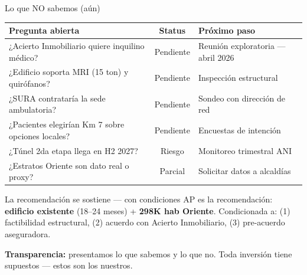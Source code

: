\documentclass[aspectratio=169, 11pt]{beamer}
\begin{document}
{
\begin{frame}{Lo que NO sabemos (aún)}
\vspace{-2pt}
{\tiny
\begin{tabular}{@{}p{5.5cm}cp{5cm}@{}}
\toprule
\textbf{Pregunta abierta} & \textbf{Status} & \textbf{Próximo paso} \\
\midrule
\rowcolor{amber!8}
¿Acierto Inmobiliario quiere inquilino médico? & Pendiente & Reunión exploratoria --- abril 2026 \\
¿Edificio soporta MRI (15 ton) y quirófanos? & Pendiente & Inspección estructural \\
\rowcolor{amber!8}
¿SURA contrataría la sede ambulatoria? & Pendiente & Sondeo con dirección de red \\
¿Pacientes elegirían Km 7 sobre opciones locales? & Pendiente & Encuestas de intención \\
\rowcolor{amber!8}
¿Túnel 2da etapa llega en H2 2027? & Riesgo & Monitoreo trimestral ANI \\
¿Estratos Oriente son dato real o proxy? & Parcial & Solicitar datos a alcaldías \\
\bottomrule
\end{tabular}
}

\vspace{3pt}
\begin{exampleblock}{\small La recomendación se sostiene --- con condiciones}
\scriptsize
AP es la recomendación: \textbf{edificio existente} (18--24 meses) + \textbf{298K hab Oriente}. Condicionada a: (1) factibilidad estructural, (2) acuerdo con Acierto Inmobiliario, (3) pre-acuerdo aseguradora.
\end{exampleblock}

{\tiny\textcolor{amber!80!black}{\textbf{Transparencia:}} presentamos lo que sabemos y lo que no. Toda inversión tiene supuestos --- estos son los nuestros.}
\end{frame}
}
\end{document}
